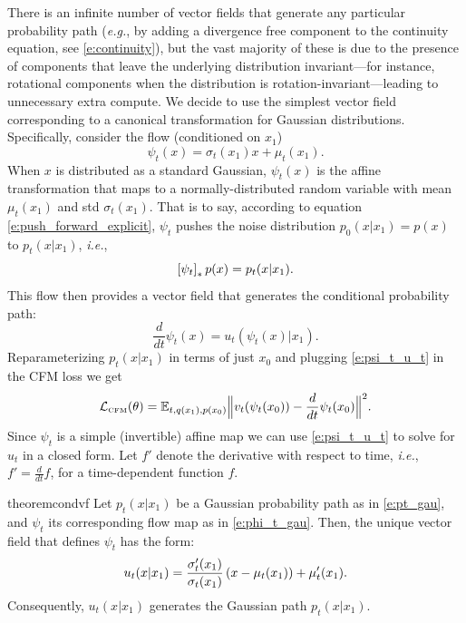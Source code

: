 \documentclass{article}
\makeatletter
\renewcommand*{\eg}{{\it e.g.}\@\xspace}
\renewcommand*{\ie}{{\it i.e.}\@\xspace}
\makeatother
\begin{document}
There is an infinite number of vector fields that generate any particular probability path (\eg, by adding a divergence free component to the continuity equation, see  \eqref{e:continuity}), but the vast majority of these is due to the presence of components that leave the underlying distribution invariant---for instance, rotational components when the distribution is rotation-invariant---leading to unnecessary extra compute.
We decide to use the simplest vector field corresponding to a canonical transformation for Gaussian distributions. Specifically, consider the flow (conditioned on $x_1$)
\begin{equation}\label{e:phi_t_gau}
    \psi_t(x) = \sigma_t(x_1)x + \mu_t(x_1).
\end{equation}
When $x$ is distributed as a standard Gaussian, $\psi_t(x)$ is the affine transformation that maps to a normally-distributed random variable with mean $\mu_t(x_1)$ and std $\sigma_t(x_1)$.
That is to say, according to equation \ref{e:push_forward_explicit}, $\psi_t$ pushes the noise distribution $p_0(x \vert x_1)=p(x)$ to $p_t(x\vert x_1)$, \ie, 
\begin{equation}
    \left [\psi_t\right ]_*p(x) = p_t(x\vert x_1).
\end{equation} 
This flow then provides a vector field that generates the conditional probability path:
\begin{equation}\label{e:psi_t_u_t}
    \frac{d}{dt}\psi_t(x) = u_t(\psi_t(x)\vert x_1).
\end{equation}
Reparameterizing $p_t(x | x_1)$ in terms of just $x_0$ and plugging \eqref{e:psi_t_u_t} in the CFM loss we get 
\begin{equation}\label{e:cfm_dt_psi}
     {\mathcal{L}}_{\scriptscriptstyle \text{CFM}}(\theta) 
     =\mathbb{E}_{t, q(x_1), p(x_0)} \Big\|v_t(\psi_t(x_0)) - \frac{d}{dt}\psi_t(x_0)\Big\|^2.     
\end{equation}
Since $\psi_t$ is a simple (invertible) affine map we can use \eqref{e:psi_t_u_t} to solve for $u_t$ in a closed form. Let $f'$ denote the derivative with respect to time, \ie, $f' = \frac{d}{dt}f$, for a time-dependent function $f$.
%
\begin{restatable}{theorem}{condvf}\label{thm:cond_vf}
Let $p_t(x\vert x_1)$ be a Gaussian probability path as in \eqref{e:pt_gau}, and $\psi_t$ its corresponding flow map as in \eqref{e:phi_t_gau}. 
Then, the unique vector field that defines $\psi_t$ has the form:
\begin{equation}\label{e:u_t_cond_x1}
    u_t(x\vert x_1) = 
    \frac{\sigma'_t(x_1)}{\sigma_t(x_1)}\left (x-\mu_t(x_1)\right ) + \mu'_t(x_1).
\end{equation}
Consequently, $u_t(x\vert x_1)$ generates the Gaussian path $p_t(x\vert x_1)$.
\end{restatable}
\end{document}
